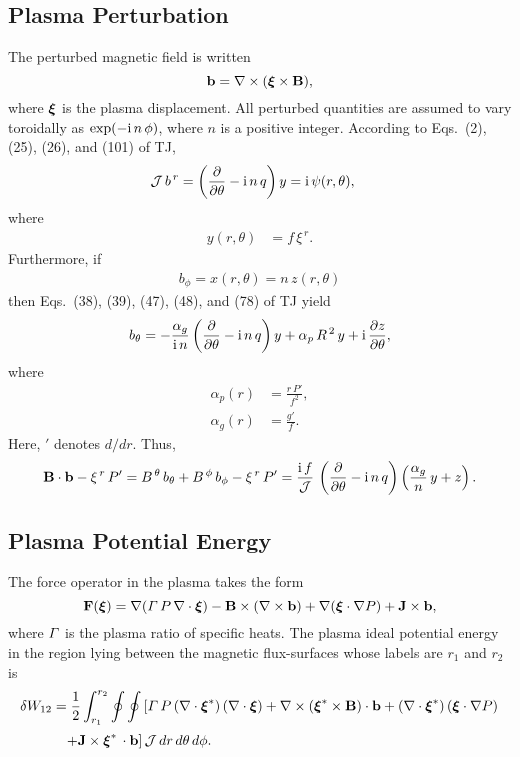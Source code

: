 \documentclass[12pt,prb,aps,notitlepage]{revtex4-1}
\newcommand{\bxi}{\mbox{\boldmath$\xi$}}
\begin{document}
\subsection{Plasma Perturbation}
The perturbed magnetic field is written 
\begin{equation}
{\bf b} = \nabla\times (\bxi\times{\bf B}),
\end{equation}
where $\bxi$ is the plasma displacement. All perturbed quantities are assumed to vary toroidally as $\exp(-{\rm i}\,n\,\phi)$,
where $n$ is a positive integer. According to Eqs.~(2), (25), (26), and
(101) of TJ, 
\begin{align}\label{e9}
{\cal J}\,b^{\,r}&=\left(\frac{\partial}{\partial\theta}-{\rm i}\,n\,q\right)y = {\rm i}\,\psi(r,\theta),
\end{align}
where
\begin{align}\label{e10}
y(r,\theta)&= f\,\xi^{\,r}.
\end{align}
Furthermore, if
\begin{align}
b_\phi = x(r,\theta)= n\,z(r,\theta)
\end{align}
then Eqs.~(38), (39), (47), (48), and (78) of TJ yield
\begin{align}
b_\theta = -\frac{\alpha_g}{{\rm i}\,n}\left(\frac{\partial}{\partial\theta} - {\rm i}\,n\,q\right)y +\alpha_p\,R^{\,2}\,y +{\rm i}\,\frac{\partial z}{\partial\theta},
\end{align}
where
\begin{align}
\alpha_p(r) &= \frac{r\,P'}{f^2},\label{ap}\\[0.5ex]
\alpha_g (r)&= \frac{g'}{f}.\label{ag}
\end{align}
Here, $'$ denotes $d/dr$. 
Thus,
\begin{equation}\label{e15}
{\bf B}\cdot{\bf b} -\xi^{\,r}\,P' = B^{\,\theta}\,b_\theta+B^{\,\phi}\,b_\phi - \xi^{\,r}\,P'=
\frac{{\rm i}\,f}{\cal J}\,\left(\frac{\partial}{\partial\theta}- {\rm i}\,n\,q\right)\left(\frac{\alpha_g}{n}\,y+z\right).
\end{equation}

\subsection{Plasma Potential Energy}
The force operator in the plasma takes the form 
\begin{equation}
{\bf F}(\bxi)= \nabla({\mit\Gamma}\,P\,\nabla\cdot\bxi) - {\bf B}\times(\nabla\times {\bf b})+\nabla(\bxi\cdot\nabla P)+{\bf J}\times  {\bf b},
\end{equation}
where ${\mit\Gamma}$ is the plasma ratio of specific heats. 
The plasma ideal potential energy in the region lying between the magnetic  flux-surfaces whose labels are $r_1$ and $r_2$ is 
\begin{align}
\delta W_{12} &= \frac{1}{2}\int_{r_1}^{r_2}\oint\oint\left[{\mit\Gamma}\,P\,(\nabla\cdot\bxi^\ast)\,(\nabla\cdot\bxi)+ \nabla\times (\bxi^\ast\times {\bf B})\cdot {\bf b}
+(\nabla\cdot\bxi^\ast)\,(\bxi\cdot\nabla P)\right.\nonumber\\[0.5ex]&\phantom{=}
\left.+{\bf J}\times \bxi^\ast\,\cdot{\bf b}\right]{\cal J}\,dr\,d\theta\,d\phi.
\end{align}
\end{document}
